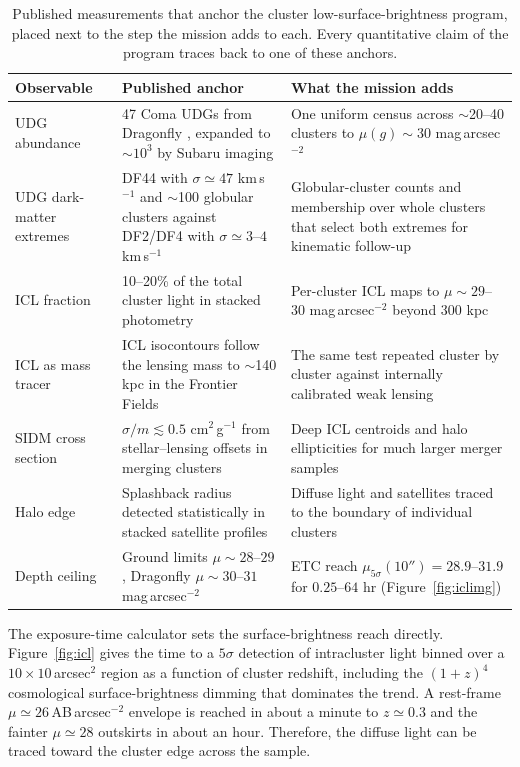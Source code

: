 \documentclass[10pt,onecolumn]{article}
\begin{document}
\begin{table}[tp]
\centering
\sffamily\small
\begin{tabularx}{\textwidth}{@{}p{2.6cm}p{5.6cm}X@{}}
\toprule
\textbf{Observable} & \textbf{Published anchor} & \textbf{What the mission adds}\\
\midrule
UDG abundance & 47 Coma UDGs from Dragonfly \cite{vandokkum2015coma}, expanded to $\sim\!10^3$ by Subaru imaging \cite{koda2015,yagi2016} & One uniform census across $\sim$20--40 clusters to $\mu(g)\sim30$ mag\,arcsec$^{-2}$\\
UDG dark-matter extremes & DF44 with $\sigma\simeq47$ km\,s$^{-1}$ and $\sim$100 globular clusters \cite{vandokkum2016df44} against DF2/DF4 with $\sigma\simeq3$--$4$ km\,s$^{-1}$ \cite{vandokkum2018df2,vandokkum2019df4} & Globular-cluster counts and membership over whole clusters that select both extremes for kinematic follow-up\\
ICL fraction & 10--20\% of the total cluster light in stacked photometry \cite{zibetti2005} & Per-cluster ICL maps to $\mu\sim29$--$30$ mag\,arcsec$^{-2}$ beyond $300$ kpc\\
ICL as mass tracer & ICL isocontours follow the lensing mass to $\sim$140 kpc in the Frontier Fields \cite{montes2019icl} & The same test repeated cluster by cluster against internally calibrated weak lensing\\
SIDM cross section & $\sigma/m\lesssim0.5$ cm$^2$\,g$^{-1}$ from stellar--lensing offsets in merging clusters \cite{harvey2015} & Deep ICL centroids and halo ellipticities for much larger merger samples\\
Halo edge & Splashback radius detected statistically in stacked satellite profiles \cite{more2016} & Diffuse light and satellites traced to the boundary of individual clusters\\
Depth ceiling & Ground limits $\mu\sim28$--$29$, Dragonfly $\mu\sim30$--$31$ mag\,arcsec$^{-2}$ \cite{abraham2014dragonfly} & ETC reach $\mu_{5\sigma}(10'')=28.9$--$31.9$ for $0.25$--$64$ hr (Figure~\ref{fig:iclimg})\\
\bottomrule
\end{tabularx}
\caption{Published measurements that anchor the cluster low-surface-brightness program, placed next to the step the mission adds to each. Every quantitative claim of the program traces back to one of these anchors.}
\label{tab:lsbanchors}
\end{table}

The exposure-time calculator sets the surface-brightness reach directly. Figure~\ref{fig:icl} gives the time to a $5\sigma$ detection of intracluster light binned over a $10\times10$\,arcsec$^2$ region as a function of cluster redshift, including the $(1+z)^4$ cosmological surface-brightness dimming that dominates the trend. A rest-frame $\mu\simeq26$\,AB\,arcsec$^{-2}$ envelope is reached in about a minute to $z\simeq0.3$ and the fainter $\mu\simeq28$ outskirts in about an hour. Therefore, the diffuse light can be traced toward the cluster edge across the sample.
\end{document}
